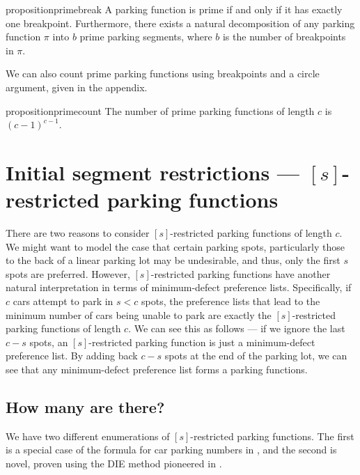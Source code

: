 \documentclass[12 pt]{amsart}
\theoremstyle{definition} %
\theoremstyle{remark} %
\begin{document}
\begin{restatable}{proposition}{primebreak}
    A parking function is prime if and only if it has exactly one breakpoint. Furthermore, there exists a natural decomposition of any parking function $\pi$ into $b$ prime parking segments, where $b$ is the number of breakpoints in $\pi$.
\end{restatable}

We can also count prime parking functions using breakpoints and a circle argument, given in the appendix.

\begin{restatable}{proposition}{primecount}
    The number of prime parking functions of length $c$ is $(c-1)^{c-1}$.
\end{restatable}

\section{\texorpdfstring{Initial segment restrictions --- $[s]$-restricted parking functions}{Initial segment restrictions}} \label{s:init-res}

There are two reasons to consider $[s]$-restricted parking functions of length $c$. We might want to model the case that certain parking spots, particularly those to the back of a linear parking lot may be undesirable, and thus, only the first $s$ spots are preferred. However, $[s]$-restricted parking functions have another natural interpretation in terms of minimum-defect preference lists. Specifically, if $c$ cars attempt to park in $s < c$ spots, the preference lists that lead to the minimum number of cars being unable to park are exactly the $[s]$-restricted parking functions of length $c$. We can see this as follows --- if we ignore the last $c - s$ spots, an $[s]$-restricted parking function is just a minimum-defect preference list. By adding back $c - s$ spots at the end of the parking lot, we can see that any minimum-defect preference list forms a parking functions.

\subsection{How many are there?}

We have two different enumerations of $[s]$-restricted parking functions. The first is a special case of the formula for car parking numbers in \cite{cameron-johannsen-prellberg-schweitzer-2008}, and the second is novel, proven using the DIE method pioneered in \cite{benjamin-quinn-2008}.
\end{document}
